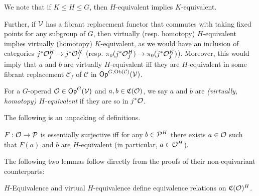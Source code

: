 \documentclass[a4paper,10pt
,draft
]{article}%
\newcommand{\I}{\mathbb I}
\newcommand{\J}{\mathbb J}
\renewcommand{\1}{\ensuremath{\mathbb{id}}}
\begin{document}
\begin{remark}
      \label{HK_EQUIV_REM}
      We note that if $K \leq H \leq G$, then $H$-equivalent implies $K$-equivalent.
      
      Further, if $\V$ has a fibrant replacement functor that commutes with taking fixed points for any subgroup of $G$,     
      then virtually (resp. homotopy) $H$-equivalent implies virtually (homotopy) $K$-equivalent,
      as we would have an inclusion of categories
      $j^{\**}\O^H_f \to j^{\**}\O^K_f$
      (resp. $\pi_0(j^{\**}\O^H_f) \to \pi_0(j^{\**}\O^K_f)$).
      Moreover, this would imply that $a$ and $b$ are virtually $H$-equivalent iff
      they are $H$-equivalent in some fibrant replacement $\mathcal C_f$ of $\mathcal C$ in $\Op^{G, \mathrm{Ob}(\mathcal C)}(\V)$.
\end{remark}

\begin{definition}
      For a $G$-operad $\O\in \mathsf{Op}^G(\V)$ and $a,b\in \C(\O)$, we say $a$ and $b$ are
      {\em (virtually, homotopy) $H$-equivalent}
      if they are so in $j^*\O$. 
\end{definition}

The following is an unpacking of definitions.
\begin{lemma}
      \label{ESS_SUR_LEM}
      $F: \O \to \P$ is essentially surjective iff
      for any $b \in \P^H$ there exists $a \in \O$ such that $F(a)$ and $b$ are $H$-equivalent
      (in particular, $a \in \O^H$).
\end{lemma}


The following two lemmas follow directly from the proofs of their non-equivariant counterparts:
\begin{lemma}
      \label{CAV_4.10_LEM}
      $H$-Equivalence and virtual $H$-equivalence define equivalence relations on $\C(\O)^H$.
\end{lemma}

        
        
        
\end{document}
